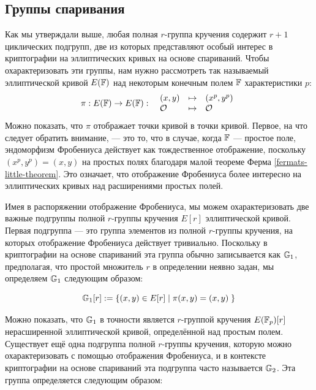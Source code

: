 \subsection{Группы спаривания}
\label{sec:pairing_groups}
 Как мы утверждали выше, любая полная $r$-группа кручения содержит $r+1$ циклических подгрупп, две из которых представляют особый интерес в криптографии на эллиптических кривых на основе спариваний. Чтобы охарактеризовать эти группы, нам нужно рассмотреть так называемый  эллиптической кривой $E(\mathbb{F})$ над некоторым конечным полем $\mathbb{F}$ характеристики $p$:
\begin{equation}\label{eq:frobenius-enomorphism}
\pi : E(\mathbb{F}) \to E(\mathbb{F}): \;\; 
\begin{array}{lcl}
(x,y)       &\mapsto & (x^p,y^p)\\
\mathcal{O} &\mapsto & \mathcal{O}
\end{array} 
\end{equation}
Можно показать, что $\pi$ отображает точки кривой в точки кривой. Первое, на что следует обратить внимание, — это то, что в случае, когда $\mathbb{F}$ — простое поле, эндоморфизм Фробениуса действует как тождественное отображение, поскольку $(x^p,y^p) = (x,y)$ на простых полях благодаря малой теореме Ферма \ref{fermats-little-theorem}. Это означает, что отображение Фробениуса более интересно на эллиптических кривых над расширениями простых полей.

Имея в распоряжении отображение Фробениуса, мы можем охарактеризовать две важные подгруппы полной $r$-группы кручения $E[r]$ эллиптической кривой. Первая подгруппа — это группа элементов из полной $r$-группы кручения, на которых отображение Фробениуса действует тривиально. Поскольку в криптографии на основе спариваний эта группа обычно записывается как $\mathbb{G}_1$, предполагая, что простой множитель $r$ в определении неявно задан, мы определяем $\mathbb{G}_1$ следующим образом:

\begin{equation}
\label{def:pairing_group_G1}
\mathbb{G}_1[r] := \{(x,y)\in E[r]\;|\; \pi(x,y) = (x,y)\;\}
\end{equation}

Можно показать, что $\mathbb{G}_1$ в точности является $r$-группой кручения $E(\mathbb{F}_p)[r]$ нерасширенной эллиптической кривой, определённой над простым полем. Существует ещё одна подгруппа полной $r$-группы кручения, которую можно охарактеризовать с помощью отображения Фробениуса, и в контексте криптографии на основе спариваний эта подгруппа часто называется $\mathbb{G}_2$. Эта группа определяется следующим образом:

